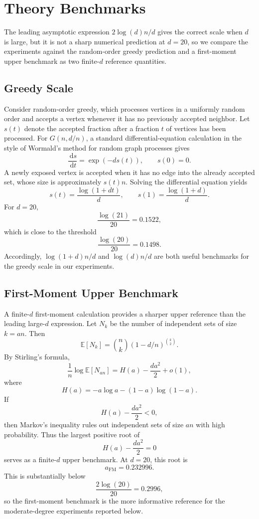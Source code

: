 \documentclass[11pt]{article}
\newcommand{\E}{\mathbb{E}}
\newcommand{\dd}{\,\mathrm{d}}
\begin{document}
\section{Theory Benchmarks}

The leading asymptotic expression $2\log(d)n/d$ gives the correct scale when
$d$ is large, but it is not a sharp numerical prediction at $d=20$, so we
compare the experiments against the random-order greedy prediction and a
first-moment upper benchmark as two finite-$d$ reference quantities.

\subsection{Greedy Scale}

Consider random-order greedy, which processes vertices in a uniformly random
order and accepts a vertex whenever it has no previously accepted neighbor.
Let $s(t)$ denote the accepted fraction after a fraction $t$ of vertices has
been processed.  For $G(n,d/n)$, a standard differential-equation calculation
in the style of Wormald's method for random graph processes \cite{wormald1995}
gives
\[
\frac{\dd s}{\dd t}=\exp(-d s(t)),\qquad s(0)=0.
\]
A newly exposed vertex is accepted when it has no edge into the
already accepted set, whose size is approximately $s(t)n$.  Solving the
differential equation yields
\[
s(t)=\frac{\log(1+dt)}{d},
\qquad
s(1)=\frac{\log(1+d)}{d}.
\]
For $d=20$,
\[
\frac{\log(21)}{20}=0.1522,
\]
which is close to the threshold
\[
\frac{\log(20)}{20}=0.1498.
\]
Accordingly, $\log(1+d)n/d$ and $\log(d)n/d$ are both useful benchmarks for
the greedy scale in our experiments.

\subsection{First-Moment Upper Benchmark}

A finite-$d$ first-moment calculation provides a sharper upper reference than
the leading large-$d$ expression.  Let $N_k$ be the number of independent sets
of size $k=an$.  Then
\[
\E[N_k]=\binom{n}{k}(1-d/n)^{\binom{k}{2}}.
\]
By Stirling's formula,
\[
\frac{1}{n}\log \E[N_{an}]
=
H(a)-\frac{d a^2}{2}+o(1),
\]
where
\[
H(a)=-a\log a-(1-a)\log(1-a).
\]
If
\[
H(a)-\frac{d a^2}{2}<0,
\]
then Markov's inequality rules out independent sets of size $an$ with high
probability.  Thus the largest positive root of
\[
H(a)-\frac{d a^2}{2}=0
\]
serves as a finite-$d$ upper benchmark.  At $d=20$, this root is
\[
a_{\mathrm{FM}}=0.232996.
\]
This is substantially below
\[
\frac{2\log(20)}{20}=0.2996,
\]
so the first-moment benchmark is the more informative reference for the
moderate-degree experiments reported below.
\end{document}
